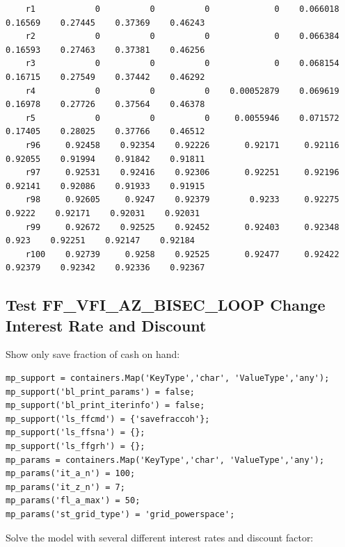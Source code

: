\documentclass[
]{book}
\begin{document}
\begin{verbatim}
    r1            0          0          0             0    0.066018    0.16569    0.27445    0.37369    0.46243
    r2            0          0          0             0    0.066384    0.16593    0.27463    0.37381    0.46256
    r3            0          0          0             0    0.068154    0.16715    0.27549    0.37442    0.46292
    r4            0          0          0    0.00052879    0.069619    0.16978    0.27726    0.37564    0.46378
    r5            0          0          0     0.0055946    0.071572    0.17405    0.28025    0.37766    0.46512
    r96     0.92458    0.92354    0.92226       0.92171     0.92116    0.92055    0.91994    0.91842    0.91811
    r97     0.92531    0.92416    0.92306       0.92251     0.92196    0.92141    0.92086    0.91933    0.91915
    r98     0.92605     0.9247    0.92379        0.9233     0.92275     0.9222    0.92171    0.92031    0.92031
    r99     0.92672    0.92525    0.92452       0.92403     0.92348      0.923    0.92251    0.92147    0.92184
    r100    0.92739     0.9258    0.92525       0.92477     0.92422    0.92379    0.92342    0.92336    0.92367
\end{verbatim}

\hypertarget{test-ff_vfi_az_bisec_loop-change-interest-rate-and-discount}{%
\subsection{Test FF\_VFI\_AZ\_BISEC\_LOOP Change Interest Rate and Discount}\label{test-ff_vfi_az_bisec_loop-change-interest-rate-and-discount}}

Show only save fraction of cash on hand:

\begin{verbatim}
mp_support = containers.Map('KeyType','char', 'ValueType','any');
mp_support('bl_print_params') = false;
mp_support('bl_print_iterinfo') = false;
mp_support('ls_ffcmd') = {'savefraccoh'};
mp_support('ls_ffsna') = {};
mp_support('ls_ffgrh') = {};
mp_params = containers.Map('KeyType','char', 'ValueType','any');
mp_params('it_a_n') = 100;
mp_params('it_z_n') = 7;
mp_params('fl_a_max') = 50;
mp_params('st_grid_type') = 'grid_powerspace';
\end{verbatim}

Solve the model with several different interest rates and discount
factor:
\end{document}
